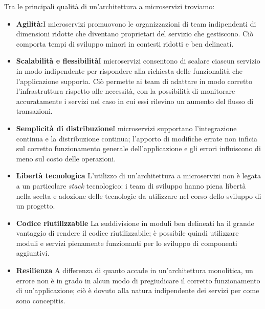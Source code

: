 Tra le principali qualità di un'architettura a microservizi troviamo:

\begin{itemize}
	\item \textbf{Agilità:}I microservizi promuovono le organizzazioni di team indipendenti di dimensioni ridotte che diventano proprietari del servizio che gestiscono. Ciò comporta tempi di sviluppo minori in contesti ridotti e ben delineati.
	\item \textbf{Scalabilità e flessibilità}I microservizi consentono di scalare ciascun servizio in modo indipendente per rispondere alla richiesta delle funzionalità che l'applicazione supporta. Ciò permette ai team di adattare in modo corretto l’infrastruttura rispetto alle necessità, con la possibilità di monitorare accuratamente i servizi nel caso in cui essi rilevino un aumento del flusso di transazioni.
	\item \textbf{Semplicità di distribuzione}I microservizi supportano l’integrazione continua e la distribuzione continua; l'apporto di modifiche errate non inficia sul corretto funzionamento generale dell'applicazione e gli errori influiscono di meno sul costo delle operazioni. 
	\item \textbf{Libertà tecnologica} L'utilizzo di un'architettura a microservizi non è legata a un particolare \textit{stack} tecnologico: i team di sviluppo hanno piena libertà nella scelta e adozione delle tecnologie da utilizzare nel corso dello sviluppo di un progetto.
	\item \textbf{Codice riutilizzabile} La suddivisione in moduli ben delineati ha il grande vantaggio di rendere il codice riutilizzabile; è possibile quindi utilizzare moduli e servizi pienamente funzionanti per lo sviluppo di componenti aggiuntivi.
	\item \textbf{Resilienza} A differenza di quanto accade in un'architettura monolitica, un errore non è in grado in alcun modo di pregiudicare il corretto funzionamento di un'applicazione; ciò è dovuto alla natura indipendente dei servizi per come sono concepitis.
	
\end{itemize}